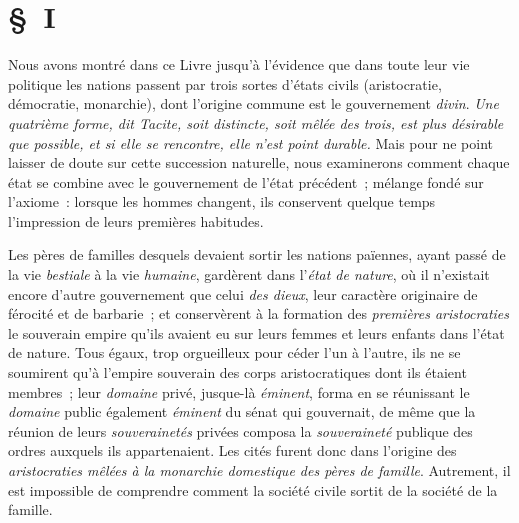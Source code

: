 \documentclass[french,twoside]{book} %
\newcommand\chaptercont{} %
\begin{document}
\chaptercont
\section[{§ I}]{§ I}
\noindent  Nous avons montré dans ce Livre jusqu’à l’évidence que dans toute leur vie politique les nations passent par trois sortes d’états civils (aristocratie, démocratie, monarchie), dont l’origine commune est le gouvernement {\itshape divin}. \emph{{\itshape Une quatrième forme}, dit Tacite, {\itshape  soit distincte, soit mêlée des trois, est plus désirable que possible, et si elle se rencontre, elle n’est point durable.}} Mais pour ne point laisser de doute sur cette succession naturelle, nous examinerons comment chaque état se combine avec le gouvernement de l’état précédent ; mélange fondé sur l’axiome : lorsque les hommes changent, ils conservent quelque temps l’impression de leurs premières habitudes.\par
Les pères de familles desquels devaient sortir les nations païennes, ayant passé de la vie {\itshape bestiale} à la vie {\itshape humaine}, gardèrent dans l’{\itshape état de nature},  où il n’existait encore d’autre gouvernement que celui {\itshape des dieux}, leur caractère originaire de férocité et de barbarie ; et conservèrent à la formation des {\itshape premières aristocraties} le souverain empire qu’ils avaient eu sur leurs femmes et leurs enfants dans l’état de nature. Tous égaux, trop orgueilleux pour céder l’un à l’autre, ils ne se soumirent qu’à l’empire souverain des corps aristocratiques dont ils étaient membres ; leur {\itshape domaine} privé, jusque-là {\itshape éminent}, forma en se réunissant le {\itshape domaine} public également {\itshape éminent} du sénat qui gouvernait, de même que la réunion de leurs {\itshape souverainetés} privées composa la {\itshape souveraineté} publique des ordres auxquels ils appartenaient. Les cités furent donc dans l’origine des {\itshape aristocraties mêlées à la monarchie domestique des pères de famille}. Autrement, il est impossible de comprendre comment la société civile sortit de la société de la famille.\par
\end{document}
